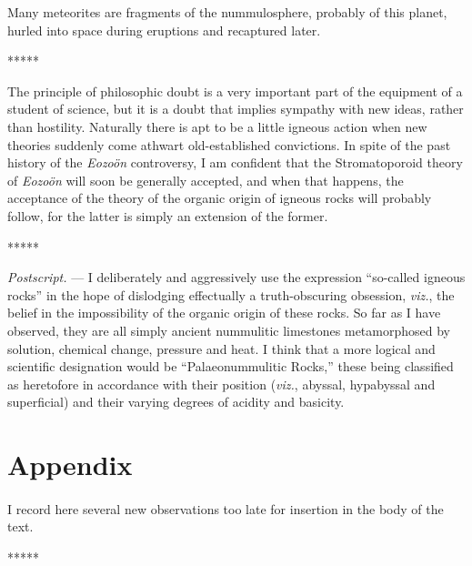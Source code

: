 \documentclass[a4paper, 12pt, oneside]{article}
\begin{document}
Many meteorites are fragments of the nummulosphere, probably of this planet, hurled into space during eruptions and recaptured later.

\centerline{*\hspace{15mm}*\hspace{15mm}*\hspace{15mm}*\hspace{15mm}*}
\bigskip

The principle of philosophic doubt is a very important part of the equipment of a student of science, but it is a doubt that implies sympathy with new ideas, rather than hostility. Naturally there is apt to be a little igneous action when new theories suddenly come athwart old-established convictions. In spite of the past history of the \emph{Eozoön} controversy, I am confident that the Stromatoporoid theory of \emph{Eozoön} will soon be generally accepted, and when that happens, the acceptance of the theory of the organic origin of igneous rocks will probably follow, for the latter is simply an extension of the former.

\centerline{*\hspace{15mm}*\hspace{15mm}*\hspace{15mm}*\hspace{15mm}*}
\bigskip

\small
\emph{Postscript.} --- I deliberately and aggressively use the expression ``so-called igneous rocks'' in the hope of dislodging effectually a truth-obscuring obsession, \emph{viz.}, the belief in the impossibility of the organic origin of these rocks. So far as I have observed, they are all simply ancient nummulitic limestones metamorphosed by solution, chemical change, pressure and heat. I think that a more logical and scientific designation would be ``Palaeonummulitic Rocks,'' these being classified as heretofore in accordance with their position (\emph{viz.}, abyssal, hypabyssal and superficial) and their varying degrees of acidity and basicity.
\normalsize
\clearpage
\section{Appendix}
\paragraph{}
I record here several new observations too late for insertion in the body of the text.

\centerline{*\hspace{15mm}*\hspace{15mm}*\hspace{15mm}*\hspace{15mm}*}
\bigskip
\end{document}
